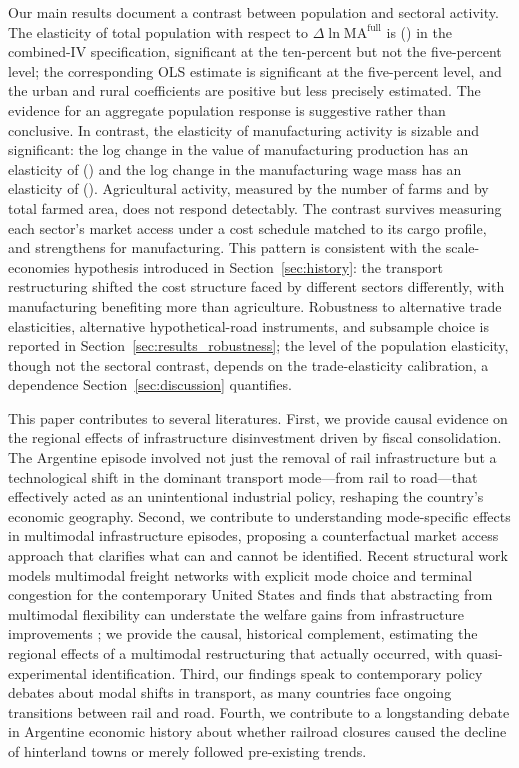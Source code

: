 Our main results document a contrast between population and sectoral
activity. The elasticity of total population with respect to
$\Delta \ln \mathrm{MA}^{\mathrm{full}}$ is \mainPopCoefIVBoth{}
(\mainPopSEIVBoth{}) in the combined-IV specification, significant at
the ten-percent but not the five-percent level; the corresponding OLS
estimate is significant at the five-percent level, and the urban and
rural coefficients are positive but less precisely estimated. The
evidence for an aggregate population response is suggestive rather
than conclusive. In
contrast, the elasticity of manufacturing activity is sizable and
significant: the log change in the value of manufacturing production
has an elasticity of \mfgValprodCoefIVBoth{} (\mfgValprodSEIVBoth{})
and the log change in the manufacturing wage mass has an elasticity
of \mfgWageMassCoefIVBoth{} (\mfgWageMassSEIVBoth{}). Agricultural
activity, measured by the number of farms and by total farmed area,
does not respond detectably. The contrast survives measuring each
sector's market access under a cost schedule matched to its cargo
profile, and strengthens for manufacturing. This pattern is consistent with the
scale-economies hypothesis introduced in Section~\ref{sec:history}:
the transport restructuring shifted the cost structure faced by
different sectors differently, with manufacturing benefiting more
than agriculture. Robustness to alternative trade elasticities,
alternative hypothetical-road instruments, and subsample choice is
reported in Section~\ref{sec:results_robustness}; the level of the
population elasticity, though not the sectoral contrast, depends on
the trade-elasticity calibration, a dependence
Section~\ref{sec:discussion} quantifies.

This paper contributes to several literatures. First, we provide
causal evidence on the regional effects of infrastructure
disinvestment driven by fiscal consolidation. The Argentine episode
involved not just the removal of rail infrastructure but a
technological shift in the dominant transport mode—from rail to
road—that effectively acted as an unintentional industrial policy,
reshaping the country's economic geography. Second, we contribute to
understanding mode-specific effects in multimodal infrastructure
episodes, proposing a counterfactual market access approach that
clarifies what can and cannot be identified. Recent structural work
models multimodal freight networks with explicit mode choice and
terminal congestion for the contemporary United States and finds that
abstracting from multimodal flexibility can understate the welfare
gains from infrastructure improvements \citep{fuchswong2026}; we provide the
causal, historical complement, estimating the regional effects of a
multimodal restructuring that actually occurred, with
quasi-experimental identification. Third, our findings
speak to contemporary policy debates about modal shifts in transport,
as many countries face ongoing transitions between rail and road.
Fourth, we contribute to a longstanding debate in Argentine economic
history about whether railroad closures caused the decline of
hinterland towns or merely followed pre-existing trends.

